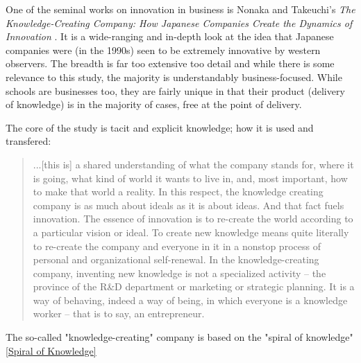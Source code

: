 One of the seminal works on innovation in business is Nonaka and Takeuchi's \textit{The Knowledge-Creating Company: How Japanese Companies Create the Dynamics of Innovation} \cite{nonaka1995knowledge}. It is a wide-ranging and in-depth look at the idea that Japanese companies were (in the 1990s) seen to be extremely innovative by western observers. The breadth is far too extensive too detail and while there is some relevance to this study, the majority is understandably business-focused. While schools are businesses too, they are fairly unique in that their product (delivery of knowledge) is in the majority of cases, free at the point of delivery.

The core of the study is tacit and explicit knowledge; how it is used and transfered:

\begin{quote}
...[this is] a shared understanding of what the company stands for, where it is going, what kind of world it wants to live in, and, most important, how to make that world a reality. In this respect, the knowledge creating company is as much about ideals as it is about ideas. And that fact fuels innovation. The essence of innovation is to re-create the world according to a particular vision or ideal. To create new knowledge means quite literally to re-create the company and everyone in it in a nonstop process of personal and organizational self-renewal. In the knowledge-creating company, inventing new knowledge is not a specialized activity – the province of the R&D department or marketing or strategic planning. It is a way of behaving, indeed a way of being, in which everyone is a knowledge worker – that is to say, an entrepreneur.
\end{quote}

The so-called "knowledge-creating" company is based on the "spiral of knowledge"\ref{Spiral of Knowledge}




\cite{StopI4:online}